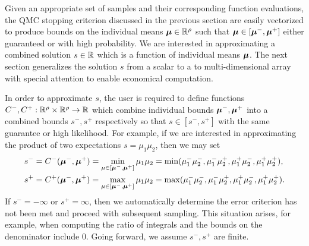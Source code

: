 \documentclass{article}[12pt]
\begin{document}
Given an appropriate set of  samples and their corresponding function evaluations, the QMC stopping criterion discussed in the previous section are easily vectorized to produce bounds on the individual means $\boldsymbol{\mu} \in \mathbb{R}^\rho$ such that $\boldsymbol{\mu} \in [\boldsymbol{\mu}^-,\boldsymbol{\mu}^+]$ either guaranteed or with high probability. We are interested in approximating a combined solution $s \in \mathbb{R}$ which is a function of individual means $\boldsymbol{\mu}$.  The next section generalizes the solution $s$ from a scalar to a to multi-dimensional array with special attention to enable economical computation.

In order to approximate $s$, the user is required to define functions $C^-,C^+: \mathbb{R}^\rho \times \mathbb{R}^\rho \to \mathbb{R}$ which combine individual bounds $\boldsymbol{\mu}^-,\boldsymbol{\mu}^+$ into a combined bounds $s^-,s^+$ respectively so that $s \in [s^-,s^+]$ with the same guarantee or high likelihood. For example, if we are interested in approximating the product of two expectations $s=\mu_1\mu_2$, then we may set
\begin{align*}
    s^- &= C^-(\boldsymbol{\mu}^-,\boldsymbol{\mu}^+) = \min_{\mu \in [\boldsymbol{\mu}^-,\boldsymbol{\mu}^+]} \mu_1\mu_2 = \min(\mu_1^-\mu_2^-,\mu_1^-\mu_2^+,\mu_1^+\mu_2^-,\mu_1^+\mu_2^+), \\
    s^+ &= C^+(\boldsymbol{\mu}^-,\boldsymbol{\mu}^+) = \max_{\mu \in [\boldsymbol{\mu}^-,\boldsymbol{\mu}^+]} \mu_1\mu_2 = \max(\mu_1^-\mu_2^-,\mu_1^-\mu_2^+,\mu_1^+\mu_2^-,\mu_1^+\mu_2^+).
\end{align*}
If $s^-=-\infty$ or $s^+=\infty$, then we automatically determine the error criterion has not been met and proceed with subsequent sampling. This situation arises, for example, when computing the ratio of integrals and the bounds on the denominator include 0. Going forward, we assume $s^-,s^+$ are finite. 
\end{document}
